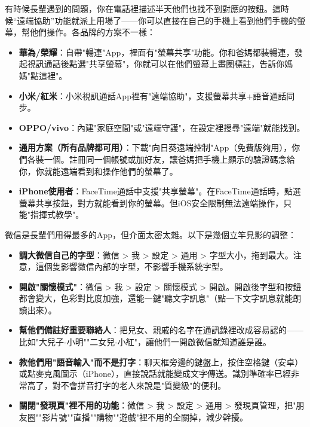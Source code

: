 
有時候長輩遇到的問題，你在電話裡描述半天他們也找不到對應的按鈕。這時候“遠端協助”功能就派上用場了——你可以直接在自己的手機上看到他們手機的螢幕，幫他們操作。各品牌的方案不一樣：

\begin{itemize}
  \item \textbf{華為/榮耀}：自帶"暢連"App，裡面有"螢幕共享"功能。你和爸媽都裝暢連，發起視訊通話後點選"共享螢幕"，你就可以在他們螢幕上畫圈標註，告訴你媽媽"點這裡"。
  \item \textbf{小米/紅米}：小米視訊通話App裡有"遠端協助"，支援螢幕共享+語音通話同步。
  \item \textbf{OPPO/vivo}：內建"家庭空間"或"遠端守護"，在設定裡搜尋"遠端"就能找到。
  \item \textbf{通用方案（所有品牌都可用）}：下載"向日葵遠端控制"App（免費版夠用），你們各裝一個。註冊同一個帳號或加好友，讓爸媽把手機上顯示的驗證碼念給你，你就能遠端看到和操作他們的螢幕了。
  \item \textbf{iPhone使用者}：FaceTime通話中支援"共享螢幕"。在FaceTime通話時，點選螢幕共享按鈕，對方就能看到你的螢幕。但iOS安全限制無法遠端操作，只能"指揮式教學"。
\end{itemize}


微信是長輩們用得最多的App，但介面太密太雜。以下是幾個立竿見影的調整：

\begin{itemize}
  \item \textbf{調大微信自己的字型}：微信 > 我 > 設定 > 通用 > 字型大小，拖到最大。注意，這個隻影響微信內部的字型，不影響手機系統字型。
  \item \textbf{開啟"關懷模式"}：微信 > 我 > 設定 > 關懷模式 > 開啟。開啟後字型和按鈕都會變大，色彩對比度加強，還能一鍵"聽文字訊息"（點一下文字訊息就能朗讀出來）。
  \item \textbf{幫他們備註好重要聯絡人}：把兒女、親戚的名字在通訊錄裡改成容易認的——比如"大兒子-小明""二女兒-小紅"，讓他們一開啟微信就知道誰是誰。
  \item \textbf{教他們用"語音輸入"而不是打字}：聊天框旁邊的鍵盤上，按住空格鍵（安卓）或點麥克風圖示（iPhone），直接說話就能變成文字傳送。識別準確率已經非常高了，對不會拼音打字的老人來說是"質變級"的便利。
  \item \textbf{關閉"發現頁"裡不用的功能}：微信 > 我 > 設定 > 通用 > 發現頁管理，把"朋友圈""影片號""直播""購物""遊戲"裡不用的全關掉，減少幹擾。
\end{itemize}


